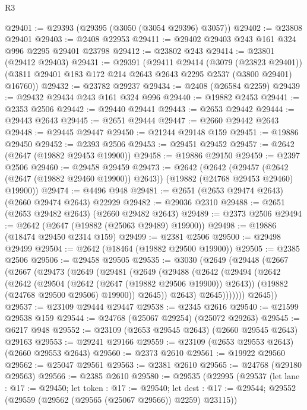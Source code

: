 \begin{lexlean}{R3}
\begin{coremodule}
@29401 := @29393 (@29395 (@3050 (@3054 @29396) @3057))
@29402 := @23808 @29401
@29403 := @2408 @22953
@29411 := @29402 @29403 @243 @161 @324 @996 @2295 @29401 @23798
@29412 := @23802 @243
@29414 := @23801 (@29412 @29403)
@29431 := @29391
    (@29411
      @29414
      (@3079 (@23823 @29401))
      (@3811 @29401 @183 @172 @214 @2643 @2643 @2295 @2537 (@3800 @29401) @16760))
@29432 := @23782 @29237
@29434 := @2408 (@26584 @2259)
@29439 := @29432 @29434 @243 @161 @324 @996
@29440 := @19882 @2453
@29441 := @2353 @2506
@29442 := @29440 @29441
@29443 := @2653 @29442
@29444 := @29443 @2643
@29445 := @2651 @29444
@29447 := @2660 @29442 @2643
@29448 := @29445 @29447
@29450 := @21244 @29148 @159
@29451 := @19886 @29450
@29452 := @2393 @2506
@29453 := @29451 @29452
@29457 := @2642 (@2647 (@19882 @29453 @19900))
@29458 := @19886 @29150
@29459 := @2397 @2506
@29460 := @29458 @29459
@29473 := @2642
    (@2642
      (@29457 (@2642 (@2647 (@19882 @29460 @19900)) @2643))
      (@19882 (@24768 @29453 @29460) @19900))
@29474 := @4496 @948
@29481 := @2651 (@2653 @29474 @2643) (@2660 @29474 @2643) @22929
@29482 := @29036 @2310
@29488 := @2651 (@2653 @29482 @2643) (@2660 @29482 @2643)
@29489 := @2373 @2506
@29494 := @2642 (@2647 (@19882 (@25063 @29489) @19900))
@29498 := @19886 (@18474 @29450 @2314 @159)
@29499 := @2381 @2506
@29500 := @29498 @29499
@29504 := @2642 (@18464 (@19882 @29500 @19900))
@29505 := @2385 @2506
@29506 := @29458 @29505
@29535 := @3030
    (@2649
      (@29448
        (@2667
          (@2667
            (@29473
              (@2649
                (@29481
                  (@2649
                    (@29488
                      (@2642
                        (@29494
                          (@2642
                            (@2642
                              (@29504 (@2642 (@2647 (@19882 @29506 @19900)) @2643))
                              (@19882 (@24768 @29500 @29506) @19900))
                            @2645))
                        @2643)
                      @2645)))))))
        @2645))
@29537 := @23109 @29444 @29447
@29538 := @2345 @2616
@29540 := @21599 @29538 @159
@29544 := @24768 (@25067 @29254) (@25072 @29263)
@29545 := @6217 @948
@29552 := @23109 (@2653 @29545 @2643) (@2660 @29545 @2643) @29163
@29553 := @29241 @29166
@29559 := @23109 (@2653 @29553 @2643) (@2660 @29553 @2643)
@29560 := @2373 @2610
@29561 := @19922 @29560
@29562 := @25047 @29561
@29563 := @2381 @2610
@29565 := @24768 (@29180 @29563)
@29566 := @2385 @2610
@29580 := @29535
    (@22995
      (@29537
        (let lane : @17 := @29450;
        let token : @17 := @29540;
        let dest : @17 := @29544; @29552 (@29559 (@29562 (@29565 (@25067 @29566)) @2259) @23115))

\end{coremodule}
\end{lexlean}
